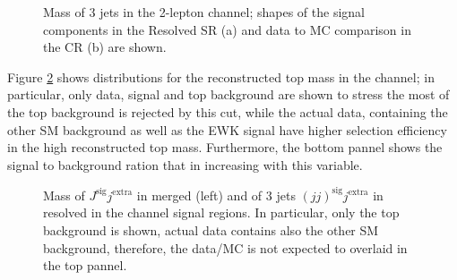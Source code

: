 \begin{figure}[ht]
    \begin{center}
        \caption{ Mass of 3 jets in the 2-lepton channel; shapes of the signal components in the Resolved SR (a) and data to MC comparison in the \Zjets CR (b) are shown.} 
        \label{fig:2leptopMass}
    \end{center}
\end{figure}

Figure \ref{fig:0leptopMass} shows distributions for the reconstructed top mass in the \zlep channel; 
in particular, only data, signal and top background are shown to stress the most of the top background 
is rejected by this cut, while the actual data, containing the other SM background as well as the EWK signal
have higher selection efficiency in the high reconstructed top mass. 
Furthermore, the bottom pannel shows the signal to background ration that in increasing with this variable.

\begin{figure}[ht]
    \begin{center}
        \caption{ Mass of $J^\text{sig}j^\text{extra}$ in merged (left) and of 3 jets $(jj)^\text{sig}j^\text{extra}$ in resolved in the \zlep channel signal regions. In particular, only the top background is shown, actual data contains also the other SM background, therefore, the data/MC is not expected to overlaid in the top pannel.} 
        \label{fig:0leptopMass}
    \end{center}
\end{figure}


